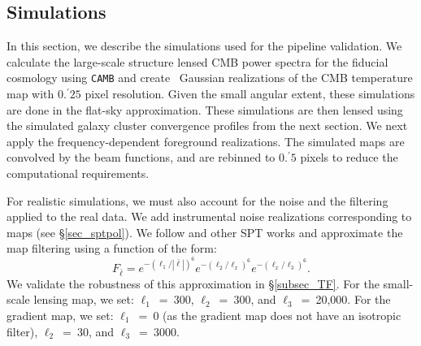 \subsection{Simulations}
\label{sims_used}
In this section, we describe the simulations used for the pipeline validation. %
We calculate the large-scale structure lensed CMB power spectra for the fiducial \citet{planck15-13} cosmology using \texttt{CAMB} \citep{lewis00} 
and create \boxsize\ Gaussian realizations of the CMB temperature map with $0.^{\prime}25$ pixel resolution.%
 Given the small angular extent, these simulations are done in the flat-sky approximation. 
These simulations are then lensed using the simulated galaxy cluster convergence profiles from the next section. 
We next apply the frequency-dependent foreground 
realizations. %
The simulated maps are convolved by the beam functions, and are rebinned to $0.^{\prime}5$ pixels to reduce the computational requirements. 

For realistic simulations, we must also account for the noise and the filtering applied to the real data. 
We add instrumental noise realizations corresponding to \sptpol{} maps (see \S\ref{sec_sptpol}).
We follow \citet{baxter18} and other SPT works and approximate the map filtering using a function of the form:
\begin{equation}
F_{\bar{\ell}} = e^{-(\ell_{1}/|\bar{\ell}|)^{6}}  e^{-(\ell_{2}/\ell_{x})^{6}} e^{-(\ell_{x}/\ell_{3})^{6}}.
\label{eq_filter_TF}
\end{equation}
We validate the robustness of this approximation in \S\ref{subsec_TF}.
For the small-scale lensing map, we set: \mbox{$\ell_{1}$ = 300}, \mbox{$\ell_{2}$ = 300}, and \mbox{$\ell_{3}$ = 20,000}. 
For the gradient map, we set: \mbox{$\ell_{1}$ = 0} (as the gradient map does not have an isotropic filter), \mbox{$\ell_{2}$ = 30}, and \mbox{$\ell_{3}$ = 3000}.

